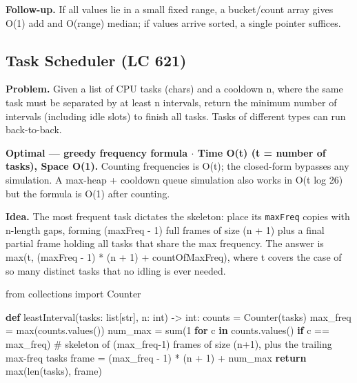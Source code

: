 \documentclass[11pt]{article}
\newenvironment{Shaded}{\begin{snugshade}}{\end{snugshade}}
\newcommand{\BuiltInTok}[1]{\textcolor[rgb]{0.50,0.55,0.55}{#1}}
\newcommand{\CommentTok}[1]{\textcolor[rgb]{0.48,0.49,0.49}{#1}}
\newcommand{\ControlFlowTok}[1]{\textcolor[rgb]{0.99,0.74,0.29}{\textbf{#1}}}
\newcommand{\DecValTok}[1]{\textcolor[rgb]{0.96,0.45,0.00}{#1}}
\newcommand{\ImportTok}[1]{\textcolor[rgb]{0.15,0.68,0.38}{#1}}
\newcommand{\KeywordTok}[1]{\textcolor[rgb]{0.81,0.81,0.76}{\textbf{#1}}}
\newcommand{\NormalTok}[1]{\textcolor[rgb]{0.81,0.81,0.76}{#1}}
\newcommand{\OperatorTok}[1]{\textcolor[rgb]{0.81,0.81,0.76}{#1}}
\begin{document}
\textbf{Follow-up.} If all values lie in a small fixed range, a bucket/count array gives O(1) add and O(range) median; if values arrive sorted, a single pointer suffices.

\subsection{Task Scheduler (LC 621)}\label{task-scheduler-lc-621}

\textbf{Problem.} Given a list of CPU tasks (chars) and a cooldown n, where the same task must be separated by at least n intervals, return the minimum number of intervals (including idle slots) to finish all tasks. Tasks of different types can run back-to-back.

\textbf{Optimal --- greedy frequency formula \(\cdot\) Time O(t) (t = number of tasks), Space O(1).} Counting frequencies is O(t); the closed-form bypasses any simulation. A max-heap + cooldown queue simulation also works in O(t log 26) but the formula is O(1) after counting.

\textbf{Idea.} The most frequent task dictates the skeleton: place its \texttt{maxFreq} copies with n-length gaps, forming (maxFreq - 1) full frames of size (n + 1) plus a final partial frame holding all tasks that share the max frequency. The answer is max(t, (maxFreq - 1) * (n + 1) + countOfMaxFreq), where t covers the case of so many distinct tasks that no idling is ever needed.


\begin{Shaded}
\begin{Highlighting}[]
\ImportTok{from}\NormalTok{ collections }\ImportTok{import}\NormalTok{ Counter}

\KeywordTok{def}\NormalTok{ leastInterval(tasks: }\BuiltInTok{list}\NormalTok{[}\BuiltInTok{str}\NormalTok{], n: }\BuiltInTok{int}\NormalTok{) }\OperatorTok{{-}\textgreater{}} \BuiltInTok{int}\NormalTok{:}
\NormalTok{    counts }\OperatorTok{=}\NormalTok{ Counter(tasks)}
\NormalTok{    max\_freq }\OperatorTok{=} \BuiltInTok{max}\NormalTok{(counts.values())}
\NormalTok{    num\_max }\OperatorTok{=} \BuiltInTok{sum}\NormalTok{(}\DecValTok{1} \ControlFlowTok{for}\NormalTok{ c }\KeywordTok{in}\NormalTok{ counts.values() }\ControlFlowTok{if}\NormalTok{ c }\OperatorTok{==}\NormalTok{ max\_freq)}
    \CommentTok{\# skeleton of (max\_freq{-}1) frames of size (n+1), plus the trailing max{-}freq tasks}
\NormalTok{    frame }\OperatorTok{=}\NormalTok{ (max\_freq }\OperatorTok{{-}} \DecValTok{1}\NormalTok{) }\OperatorTok{*}\NormalTok{ (n }\OperatorTok{+} \DecValTok{1}\NormalTok{) }\OperatorTok{+}\NormalTok{ num\_max}
    \ControlFlowTok{return} \BuiltInTok{max}\NormalTok{(}\BuiltInTok{len}\NormalTok{(tasks), frame)}
\end{Highlighting}
\end{Shaded}
\end{document}
